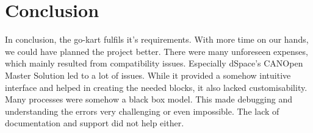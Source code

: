 
\chapter{Conclusion}
\label{chp:Conclusion}


In conclusion, the go-kart fulfils it's requirements. 
With more time on our hands, we could have planned the project better. There were many unforeseen expenses, which mainly resulted from compatibility issues. 
Especially dSpace's CANOpen Master Solution led to a lot of issues. While it provided a somehow intuitive interface and helped in creating the needed blocks, it also lacked customisability. Many processes were somehow a black box model. This made debugging and understanding the errors very challenging or even impossible. The lack of documentation and support did not help either. 